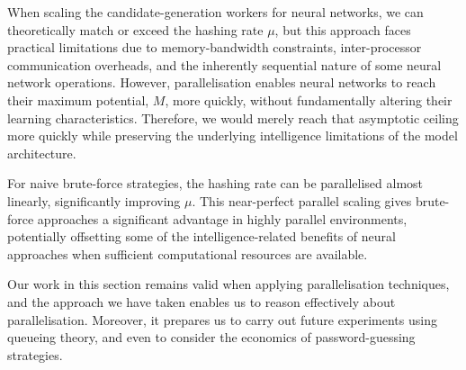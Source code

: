 When scaling the candidate-generation workers for neural networks, we can theoretically match or exceed the hashing rate $\mu$, but this approach faces practical limitations due to memory-bandwidth constraints, inter-processor communication overheads, and the inherently sequential nature of some neural network operations. However, parallelisation enables neural networks to reach their maximum potential, $M$, more quickly, without fundamentally altering their learning characteristics. Therefore, we would merely reach that asymptotic ceiling more quickly while preserving the underlying intelligence limitations of the model architecture.

For naive brute-force strategies, the hashing rate can be parallelised almost linearly, significantly improving $\mu$. This near-perfect parallel scaling gives brute-force approaches a significant advantage in highly parallel environments, potentially offsetting some of the intelligence-related benefits of neural approaches when sufficient computational resources are available.

Our work in this section remains valid when applying parallelisation techniques, and the approach we have taken enables us to reason effectively about parallelisation. Moreover, it prepares us to carry out future experiments using queueing theory, and even to consider the economics of password-guessing strategies.

% 

